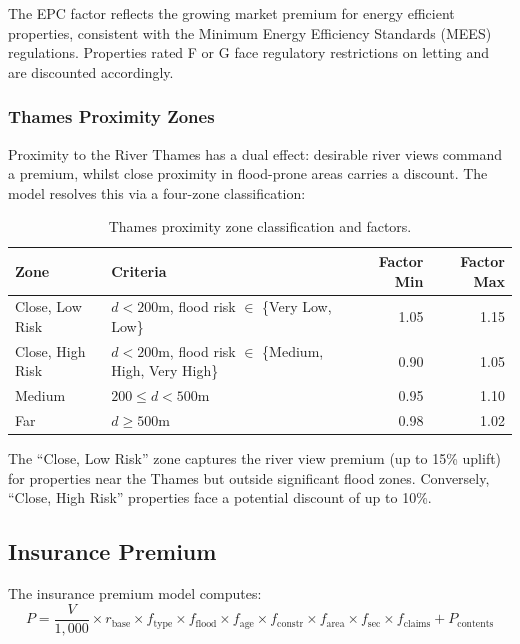 \documentclass[11pt,a4paper]{article}
\begin{document}
\noindent The EPC factor reflects the growing market premium for energy
efficient properties, consistent with the Minimum Energy Efficiency
Standards (MEES) regulations. Properties rated F or G face regulatory
restrictions on letting and are discounted accordingly.

\subsubsection{Thames Proximity Zones}

Proximity to the River Thames has a dual effect: desirable river views
command a premium, whilst close proximity in flood-prone areas carries
a discount. The model resolves this via a four-zone classification:

\begin{table}[H]
\centering
\caption{Thames proximity zone classification and factors.}
\label{tab:proximity_zones}
\begin{tabular}{llrr}
\toprule
\textbf{Zone} & \textbf{Criteria} & \textbf{Factor Min} & \textbf{Factor Max} \\
\midrule
Close, Low Risk  & $d < 200$m, flood risk $\in$ \{Very Low, Low\} & 1.05 & 1.15 \\
Close, High Risk & $d < 200$m, flood risk $\in$ \{Medium, High, Very High\} & 0.90 & 1.05 \\
Medium           & $200 \leq d < 500$m & 0.95 & 1.10 \\
Far              & $d \geq 500$m & 0.98 & 1.02 \\
\bottomrule
\end{tabular}
\end{table}

\noindent The ``Close, Low Risk'' zone captures the river view premium
(up to 15\% uplift) for properties near the Thames but outside significant
flood zones. Conversely, ``Close, High Risk'' properties face a potential
discount of up to 10\%.


\subsection{Insurance Premium}

The insurance premium model computes:
\begin{equation}
\label{eq:premium}
P = \frac{V}{1{,}000} \times r_{\mathrm{base}} \times f_{\mathrm{type}}
    \times f_{\mathrm{flood}} \times f_{\mathrm{age}}
    \times f_{\mathrm{constr}} \times f_{\mathrm{area}}
    \times f_{\mathrm{sec}} \times f_{\mathrm{claims}}
    + P_{\mathrm{contents}}
\end{equation}
\end{document}
